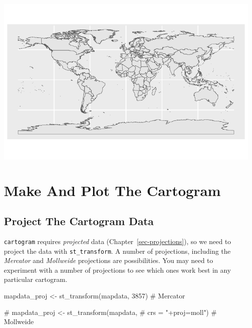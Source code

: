 \documentclass[
  letterpaper,
  DIV=11,
  numbers=noendperiod,
  oneside]{scrreprt}
\newenvironment{Shaded}{\begin{snugshade}}{\end{snugshade}}
\newcommand{\CommentTok}[1]{\textcolor[rgb]{0.37,0.37,0.37}{#1}}
\newcommand{\DecValTok}[1]{\textcolor[rgb]{0.68,0.00,0.00}{#1}}
\newcommand{\FunctionTok}[1]{\textcolor[rgb]{0.28,0.35,0.67}{#1}}
\newcommand{\NormalTok}[1]{\textcolor[rgb]{0.00,0.23,0.31}{#1}}
\newcommand{\OtherTok}[1]{\textcolor[rgb]{0.00,0.23,0.31}{#1}}
\begin{document}
\includegraphics{cartogram_files/figure-pdf/unnamed-chunk-4-1.pdf}

\section{Make And Plot The Cartogram}\label{make-and-plot-the-cartogram}

\subsection{Project The Cartogram
Data}\label{project-the-cartogram-data}

\begin{tcolorbox}[enhanced jigsaw, coltitle=black, breakable, leftrule=.75mm, opacityback=0, colback=white, bottomtitle=1mm, left=2mm, toptitle=1mm, toprule=.15mm, opacitybacktitle=0.6, rightrule=.15mm, titlerule=0mm, colframe=quarto-callout-tip-color-frame, bottomrule=.15mm, title=\textcolor{quarto-callout-tip-color}{\faLightbulb}\hspace{0.5em}{Tip}, colbacktitle=quarto-callout-tip-color!10!white, arc=.35mm]

\texttt{cartogram} requires \emph{projected} data
(Chapter~\ref{sec-projections}), so we need to project the data with
\texttt{st\_transform}. A number of projections, including the
\emph{Mercator} and \emph{Mollweide} projections are possibilities. You
may need to experiment with a number of projections to see which ones
work best in any particular cartogram.

\end{tcolorbox}

\begin{Shaded}
\begin{Highlighting}[]
\NormalTok{mapdata\_proj }\OtherTok{\textless{}{-}} \FunctionTok{st\_transform}\NormalTok{(mapdata,}
                             \DecValTok{3857}\NormalTok{) }\CommentTok{\# Mercator}

\CommentTok{\# mapdata\_proj \textless{}{-} st\_transform(mapdata, }
\CommentTok{\#                              crs = "+proj=moll") \# Mollweide}
\end{Highlighting}
\end{Shaded}
\end{document}
